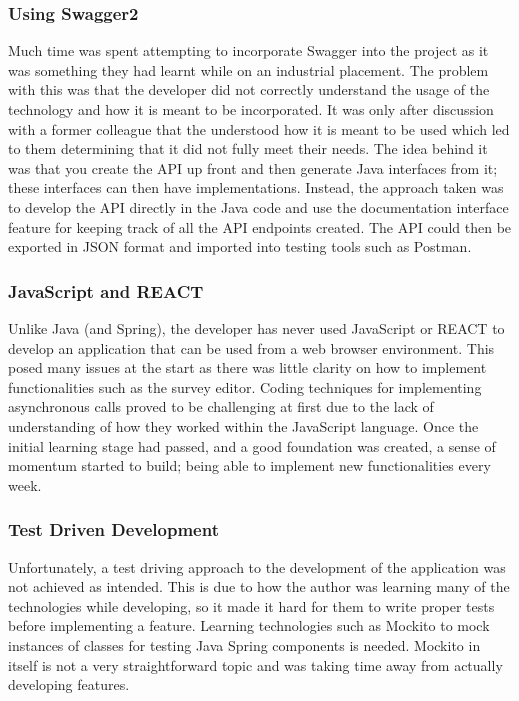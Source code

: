 \subsubsection*{Using Swagger2}
Much time was spent attempting to incorporate Swagger into the project as it was something they had learnt while on an industrial placement.
The problem with this was that the developer did not correctly understand the usage of the technology and how it is meant to be incorporated.
It was only after discussion with a former colleague that the understood how it is meant to be used which led to them determining that it did not fully meet their needs. 
The idea behind it was that you create the API up front and then generate Java interfaces from it; these interfaces can then have implementations.
Instead, the approach taken was to develop the API directly in the Java code and use the documentation interface feature for keeping track of
all the API endpoints created.
The API could then be exported in JSON format and imported into testing tools such as Postman.

\subsubsection*{JavaScript and REACT}

Unlike Java (and Spring), the developer has never used JavaScript or REACT to develop an application that can be used from a web browser 
environment.
This posed many issues at the start as there was little clarity on how to implement functionalities such as the survey editor.
Coding techniques for implementing asynchronous calls proved to be challenging at first due to the lack of understanding of how they worked within the 
JavaScript language.
Once the initial learning stage had passed, and a good foundation was created, a sense of momentum started to build; being able to implement new functionalities every week.

\subsubsection*{Test Driven Development}

Unfortunately, a test driving approach to the development of the application was not achieved as intended.
This is due to how the author was learning many of the technologies while developing, so it made it hard for them to write proper tests
before implementing a feature.
Learning technologies such as Mockito to mock instances of classes for testing Java Spring components is needed.
Mockito in itself is not a very straightforward topic and was taking time away from actually developing features.

